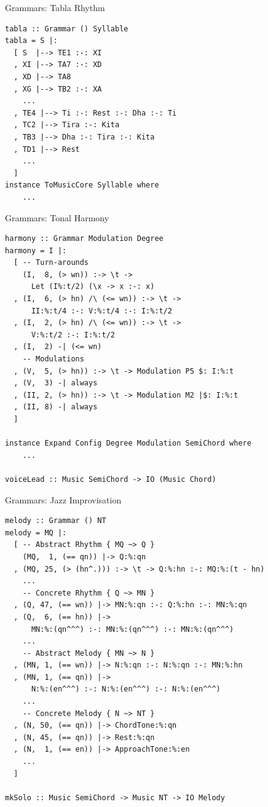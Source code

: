 \documentclass{beamer}
\begin{document}
	\begin{frame}[fragile=singleslide]{Grammars: Tabla Rhythm}
	\begin{verbatim}
tabla :: Grammar () Syllable
tabla = S |:
  [ S  |--> TE1 :-: XI
  , XI |--> TA7 :-: XD
  , XD |--> TA8
  , XG |--> TB2 :-: XA
    ...
  , TE4 |--> Ti :-: Rest :-: Dha :-: Ti
  , TC2 |--> Tira :-: Kita
  , TB3 |--> Dha :-: Tira :-: Kita
  , TD1 |--> Rest
    ...
  ]
instance ToMusicCore Syllable where
    ...
	\end{verbatim}
	\end{frame}
	
	\begin{frame}[fragile=singleslide]{Grammars: Tonal Harmony}
	\begin{verbatim}
harmony :: Grammar Modulation Degree
harmony = I |:
  [ -- Turn-arounds
    (I,  8, (> wn)) :-> \t ->
      Let (I%:t/2) (\x -> x :-: x)
  , (I,  6, (> hn) /\ (<= wn)) :-> \t ->
      II:%:t/4 :-: V:%:t/4 :-: I:%:t/2
  , (I,  2, (> hn) /\ (<= wn)) :-> \t ->
      V:%:t/2 :-: I:%:t/2
  , (I,  2) -| (<= wn)
    -- Modulations
  , (V,  5, (> hn)) :-> \t -> Modulation P5 $: I:%:t
  , (V,  3) -| always
  , (II, 2, (> hn)) :-> \t -> Modulation M2 |$: I:%:t
  , (II, 8) -| always
  ]

instance Expand Config Degree Modulation SemiChord where
    ...

voiceLead :: Music SemiChord -> IO (Music Chord)
	\end{verbatim}
	\end{frame}	
	
	\begin{frame}[fragile=singleslide]{Grammars: Jazz Improvisation}
	\begin{verbatim}
melody :: Grammar () NT
melody = MQ |:
  [ -- Abstract Rhythm { MQ ~> Q }
    (MQ,  1, (== qn)) |-> Q:%:qn
  , (MQ, 25, (> (hn^.))) :-> \t -> Q:%:hn :-: MQ:%:(t - hn)
    ...
    -- Concrete Rhythm { Q ~> MN }
  , (Q, 47, (== wn)) |-> MN:%:qn :-: Q:%:hn :-: MN:%:qn
  , (Q,  6, (== hn)) |->
      MN:%:(qn^^^) :-: MN:%:(qn^^^) :-: MN:%:(qn^^^)
    ...
    -- Abstract Melody { MN ~> N }
  , (MN, 1, (== wn)) |-> N:%:qn :-: N:%:qn :-: MN:%:hn
  , (MN, 1, (== qn)) |->
      N:%:(en^^^) :-: N:%:(en^^^) :-: N:%:(en^^^)
    ...
    -- Concrete Melody { N ~> NT }
  , (N, 50, (== qn)) |-> ChordTone:%:qn
  , (N, 45, (== qn)) |-> Rest:%:qn
  , (N,  1, (== en)) |-> ApproachTone:%:en
    ...
  ]

mkSolo :: Music SemiChord -> Music NT -> IO Melody
    \end{verbatim}
	\end{frame}
	
\end{document}
